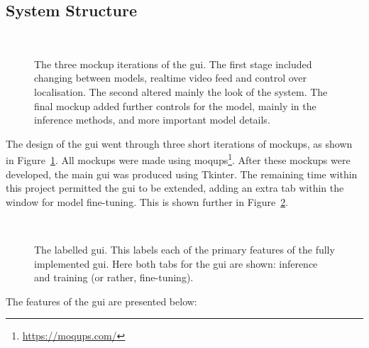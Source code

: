 \subsection{System Structure}
\begin{figure}
\centering
    \\
\caption[The three mockup iterations of the \acrfull{gui}]{The three mockup iterations of the \acrfull{gui}. The first stage included changing between models, realtime video feed and control over localisation. The second altered mainly the look of the system. The final mockup added further controls for the model, mainly in the inference methods, and more important model details.}
\label{fig:gui mockups}
\end{figure}
The design of the \acrshort{gui} went through three short iterations of mockups, as shown in Figure~\ref{fig:gui mockups}. All mockups were made using moqups\footnote{\url{https://moqups.com/}}. After these mockups were developed, the main \acrshort{gui} was produced using Tkinter. The remaining time within this project permitted the \acrshort{gui} to be extended, adding an extra tab within the window for model \gls{fine-tuning}. This is shown further in Figure~\ref{fig:annotated gui}.
\begin{figure}
\centering
    \\
\caption[The labelled \acrfull{gui}.]{The labelled \acrfull{gui}. This labels each of the primary features of the fully implemented \acrshort{gui}. Here both tabs for the \acrshort{gui} are shown: inference and training (or rather, \gls{fine-tuning}).}
\label{fig:annotated gui}
\end{figure}
The features of the \acrshort{gui} are presented below:
